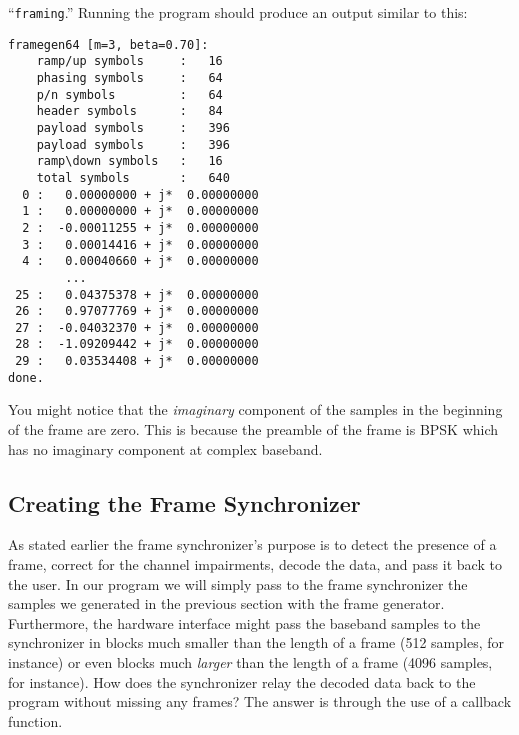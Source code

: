 ``{\tt framing}.''
Running the program should produce an output similar to this:
%
\begin{Verbatim}[fontsize=\small]
framegen64 [m=3, beta=0.70]:
    ramp/up symbols     :   16
    phasing symbols     :   64
    p/n symbols         :   64
    header symbols      :   84
    payload symbols     :   396
    payload symbols     :   396
    ramp\down symbols   :   16
    total symbols       :   640
  0 :   0.00000000 + j*  0.00000000
  1 :   0.00000000 + j*  0.00000000
  2 :  -0.00011255 + j*  0.00000000
  3 :   0.00014416 + j*  0.00000000
  4 :   0.00040660 + j*  0.00000000
        ...
 25 :   0.04375378 + j*  0.00000000
 26 :   0.97077769 + j*  0.00000000
 27 :  -0.04032370 + j*  0.00000000
 28 :  -1.09209442 + j*  0.00000000
 29 :   0.03534408 + j*  0.00000000
done.
\end{Verbatim}
%
You might notice that the {\em imaginary} component of the samples in
the beginning of the frame are zero.
This is because the preamble of the frame is BPSK which has no imaginary
component at complex baseband.

%
%
\subsection{Creating the Frame Synchronizer}
\label{tutorial:framing:framesync}

As stated earlier the frame synchronizer's purpose is to detect the
presence of a frame, correct for the channel impairments, decode the
data, and pass it back to the user.
In our program we will simply pass to the frame synchronizer the samples
we generated in the previous section with the frame generator.
Furthermore, the hardware interface might pass the baseband samples to
the synchronizer in blocks much smaller than the length of a frame
(512 samples, for instance)
or even blocks much {\em larger} than the length of a frame
(4096 samples, for instance).
How does the synchronizer relay the decoded data back to the program
without missing any frames?
The answer is through the use of a callback function.

